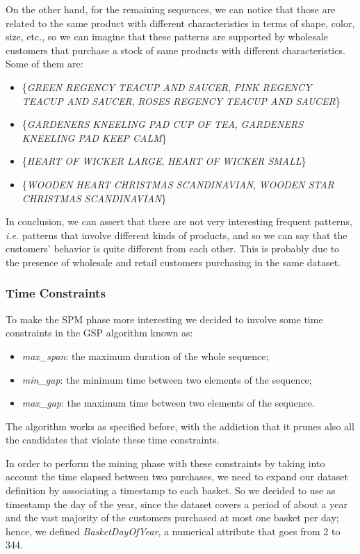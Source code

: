On the other hand, for the remaining sequences, we can notice that those are related to the same product with different characteristics in terms of shape, color, size, etc., so we can imagine that these patterns are supported by wholesale customers that purchase a stock of same products with different characteristics. Some of them are:

\begin{itemize}
\item \{\emph{GREEN REGENCY TEACUP AND SAUCER}, \emph{PINK REGENCY TEACUP AND SAUCER}, \emph{ROSES REGENCY TEACUP AND SAUCER}\}
\item \{\emph{GARDENERS KNEELING PAD CUP OF TEA}, \emph{GARDENERS KNEELING PAD KEEP CALM}\}
\item \{\emph{HEART OF WICKER LARGE}, \emph{HEART OF WICKER SMALL}\}
\item \{\emph{WOODEN HEART CHRISTMAS SCANDINAVIAN}, \emph{WOODEN STAR CHRISTMAS SCANDINAVIAN}\}
\end{itemize}

In conclusion, we can assert that there are not very interesting frequent patterns, \emph{i.e.} patterns that involve different kinds of products, and so we can say that the customers' behavior is quite different from each other. This is probably due to the presence of wholesale and retail customers purchasing in the same dataset.

\subsubsection{Time Constraints}
To make the SPM phase more interesting we decided to involve some time constraints in the GSP algorithm known as:

\begin{itemize}
\item \emph{max\_span}: the maximum duration of the whole sequence;
\item \emph{min\_gap}: the minimum time between two elements of the sequence;
\item \emph{max\_gap}: the maximum time between two elements of the sequence.
\end{itemize}

The algorithm works as specified before, with the addiction that it prunes also all the candidates that violate these time constraints.

In order to perform the mining phase with these constraints by taking into account the time elapsed between two purchases, we need to expand our dataset definition by associating a timestamp to each basket. So we decided to use as timestamp the day of the year, since the dataset covers a period of about a year and the vast majority of the customers purchased at most one basket per day; hence, we defined \emph{BasketDayOfYear}, a numerical attribute that goes from 2 to 344.

